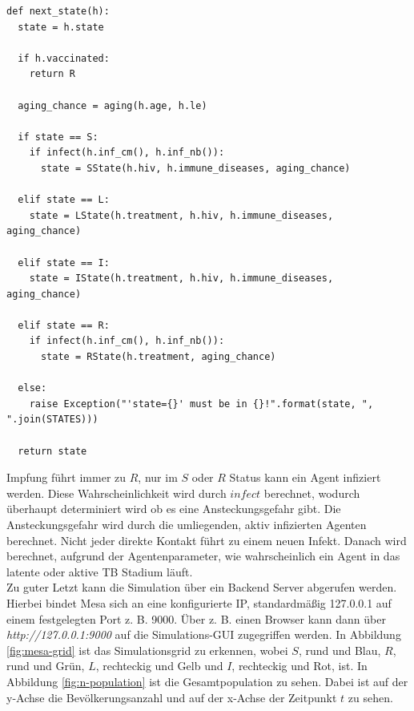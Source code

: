 \documentclass[paper=a4, fontsize=11pt, ngerman, abstract=on]{scrartcl}
\numberwithin{equation}{section} %
\numberwithin{figure}{section} %
\numberwithin{table}{section} %
\begin{document}
\begin{lstlisting}[style=python]
def next_state(h):
  state = h.state

  if h.vaccinated:
    return R

  aging_chance = aging(h.age, h.le)

  if state == S:
    if infect(h.inf_cm(), h.inf_nb()):
      state = SState(h.hiv, h.immune_diseases, aging_chance)

  elif state == L:
    state = LState(h.treatment, h.hiv, h.immune_diseases, aging_chance)

  elif state == I:
    state = IState(h.treatment, h.hiv, h.immune_diseases, aging_chance)

  elif state == R:
    if infect(h.inf_cm(), h.inf_nb()):
      state = RState(h.treatment, aging_chance)

  else:
    raise Exception("'state={}' must be in {}!".format(state, ", ".join(STATES)))

  return state
\end{lstlisting}

Impfung führt immer zu $R$, nur im $S$ oder $R$ Status kann ein Agent infiziert werden. Diese Wahrscheinlichkeit wird durch $infect$ berechnet, wodurch überhaupt determiniert wird ob es eine Ansteckungsgefahr gibt. Die Ansteckungsgefahr wird durch die umliegenden, aktiv infizierten Agenten berechnet. Nicht jeder direkte Kontakt führt zu einem neuen Infekt. Danach wird berechnet, aufgrund der Agentenparameter, wie wahrscheinlich ein Agent in das latente oder aktive TB Stadium läuft. \\

Zu guter Letzt kann die Simulation über ein Backend Server abgerufen werden. Hierbei bindet Mesa sich an eine konfigurierte IP, standardmäßig 127.0.0.1 auf einem festgelegten Port z. B. 9000. Über z. B. einen Browser kann dann über \textit{http://127.0.0.1:9000} auf die Simulations-GUI zugegriffen werden. In Abbildung \ref{fig:mesa-grid} ist das Simulationsgrid zu erkennen, wobei $S$, rund und Blau, $R$, rund und Grün, $L$, rechteckig und Gelb und $I$, rechteckig und Rot, ist. In Abbildung \ref{fig:n-population} ist die Gesamtpopulation zu sehen. Dabei ist auf der y-Achse die Bevölkerungsanzahl und auf der x-Achse der Zeitpunkt $t$ zu sehen.
\end{document}
